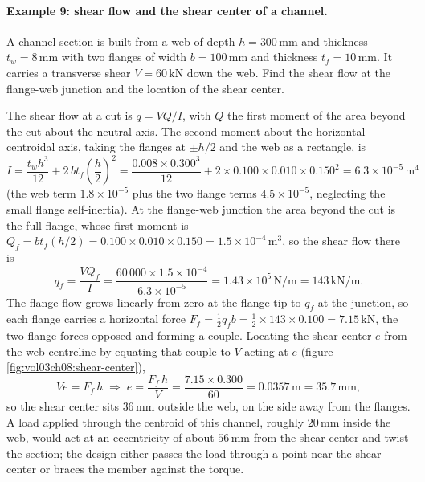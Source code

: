 \paragraph{Example 9: shear flow and the shear center of a channel.}
A channel section is built from a web of depth $h = 300\,\si{\milli
\meter}$ and thickness $t_w = 8\,\si{\milli\meter}$ with two flanges of
width $b = 100\,\si{\milli\meter}$ and thickness $t_f = 10\,\si{\milli
\meter}$. It carries a transverse shear $V = 60\,\text{kN}$ down the
web. Find the shear flow at the flange-web junction and the location of
the shear center.

The shear flow at a cut is $q = VQ/I$, with $Q$ the first moment of the
area beyond the cut about the neutral axis. The second moment about the
horizontal centroidal axis, taking the flanges at $\pm h/2$ and the web
as a rectangle, is
\[
I = \frac{t_w h^3}{12} + 2\,b t_f\left(\frac{h}{2}\right)^2
= \frac{0.008 \times 0.300^3}{12}
+ 2 \times 0.100 \times 0.010 \times 0.150^2
= 6.3 \times 10^{-5}\,\si{\meter\tothe{4}}
\]
(the web term $1.8\times 10^{-5}$ plus the two flange terms $4.5\times
10^{-5}$, neglecting the small flange self-inertia). At the flange-web
junction the area beyond the cut is the full flange, whose first moment
is $Q_f = b t_f (h/2) = 0.100 \times 0.010 \times 0.150 = 1.5 \times
10^{-4}\,\si{\meter\cubed}$, so the shear flow there is
\[
q_f = \frac{V Q_f}{I} = \frac{60\,000 \times 1.5 \times 10^{-4}}
{6.3 \times 10^{-5}} = 1.43 \times 10^{5}\,\text{N}/\text{m}
= 143\,\text{kN}/\text{m}.
\]
The flange flow grows linearly from zero at the flange tip to $q_f$ at
the junction, so each flange carries a horizontal force $F_f = \tfrac12
q_f b = \tfrac12 \times 143 \times 0.100 = 7.15\,\text{kN}$, the two
flange forces opposed and forming a couple. Locating the shear center
$e$ from the web centreline by equating that couple to $V$ acting at
$e$ (figure \ref{fig:vol03ch08:shear-center}),
\[
V e = F_f\, h \;\Rightarrow\; e = \frac{F_f\, h}{V}
= \frac{7.15 \times 0.300}{60} = 0.0357\,\si{\meter} = 35.7\,\si{
\milli\meter},
\]
so the shear center sits $36\,\si{\milli\meter}$ outside the web, on the
side away from the flanges. A load applied through the centroid of this
channel, roughly $20\,\si{\milli\meter}$ inside the web, would act at an
eccentricity of about $56\,\si{\milli\meter}$ from the shear center and
twist the section; the design either passes the load through a point
near the shear center or braces the member against the torque.



